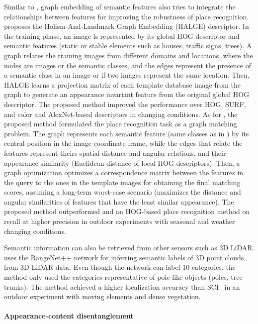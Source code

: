 Similar to \cite{singh-et-al:2021:9564866}, graph embedding of semantic features also tries to integrate the relationships between features for improving the robustness of place recognition.
\cite{han-et-al:2018:2856274} proposes the Holism-And-Landmark Graph Embedding (HALGE) descriptor. In the training phase, an image is represented by its global HOG descriptor and semantic features (static or stable elements such as houses, traffic signs, trees).
A graph relates the training images from different domains and locations, where the nodes are images or the semantic classes, and the edges represent the presence of a semantic class in an image or if two images represent the same location.
Then, HALGE learns a projection matrix of each template database image from the graph to generate an appearance invariant feature from the original global HOG descriptor. The proposed method improved the performance over HOG, SURF, and color and AlexNet-based descriptors in changing conditions.
As for \cite{gao-zhang:2020:9196906}, the proposed method formulated the place recognition task as a graph matching problem. The graph represents each semantic feature (same classes as in \cite{singh-et-al:2021:9564866}) by its central position in the image coordinate frame, while the edges that relate the features represent theirs spatial distance and angular relations, and their appearance similarity (Euclidean distance of local HOG descriptors). Then, a graph optimization optimizes a correspondence matrix between the features in the query to the ones in the template images for obtaining the final matching scores, assuming a long-term worst-case scenario (maximizes the distance and angular similarities of features that have the least similar appearance).
The proposed method outperformed \cite{han-et-al:2018:3} and an HOG-based place recognition method on recall at higher precision in outdoor experiments with seasonal and weather changing conditions.

Semantic information can also be retrieved from other sensors such as 3D LiDAR. \cite{wang-et-al:2021:9739599} uses the RangeNet++ network for inferring semantic labels of 3D point clouds from 3D LiDAR data. Even though the network can label 10 categories, the method only used the categories representative of pole-like objects (poles, tree trunks). The method achieved a higher localization accuracy than SCI~\parencite{kim-et-al:2019:2897340} in an outdoor experiment with moving elements and dense vegetation.


\paragraph{Appearance-content disentanglement}


